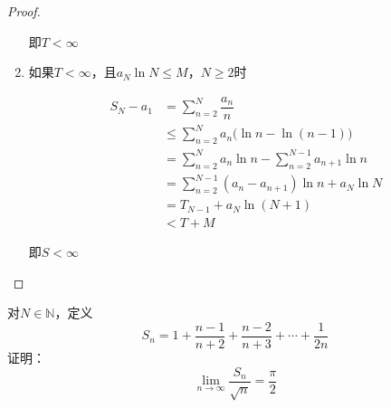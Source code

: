 \begin{proof}
\begin{enumerate}
            即$T < \infty$

        \item 
            如果$T < \infty$，且$a_{N}\ln{N} \leq M$，$N \geq 2$时
                    
            \begin{align*}
                S_N - a_1 & = \sum\limits_{n = 2}^{N}{\dfrac{a_n}{n}} \\
                & \leq \sum\limits_{n = 2}^{N}{a_n\big(\ln{n} - \ln(n - 1)\big)} \\
                & = \sum\limits_{n = 2}^{N}{a_n\ln{n}} - \sum\limits_{n = 2}^{N - 1}{a_{n + 1}\ln{n}} \\
                & = \sum\limits_{n = 2}^{N - 1}{(a_n - a_{n + 1})\ln{n}} + a_N\ln{N} \\
                & = T_{N - 1} + a_N\ln{(N + 1)} \\ 
                & < T + M
            \end{align*}

            即$S < \infty$

     \end{enumerate}

\end{proof}

\begin{proposition}
    
    对$N \in \mathbb{N}$，定义
    \[ S_n = 1 + \dfrac{n - 1}{n + 2} +\dfrac{n - 2}{n + 3} + \cdots + \dfrac{1}{2n} \]
    证明：
    \[\lim\limits_{n \to \infty}{\dfrac{S_n}{\sqrt{n}}} = \dfrac{\pi}{2}\]

\end{proposition}

